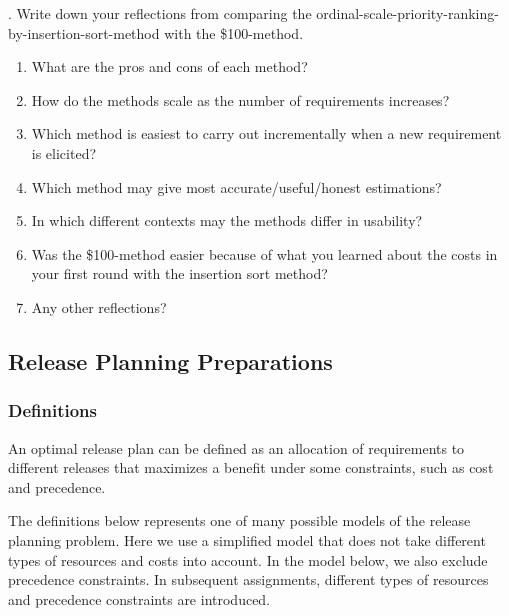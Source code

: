 \documentclass[11pt]{article}
\begin{document}
 
\begin{framed}
. Write down your reflections from comparing the ordinal-scale-priority-ranking-by-insertion-sort-method with the \$100-method. 

\begin{enumerate}[noitemsep]
\item What are the pros and cons of each method? 
\item How do the methods scale as the number of requirements increases? 
\item Which method is easiest to carry out incrementally when a new requirement is elicited?
\item Which method may give most accurate/useful/honest estimations? 
\item In which different contexts may the methods differ in usability? 
\item Was the \$100-method easier because of what you learned about the costs in your first round with the insertion sort method? 
\item Any other reflections?
\vspace{12cm}
\end{enumerate}

\end{framed}

\clearpage\newpage 
\subsection{Release Planning Preparations}

\subsubsection{Definitions}\label{section:rpdef}

An optimal release plan can be defined as an allocation of requirements to different releases that maximizes a benefit under some constraints, such as cost and precedence. 

The definitions below represents one of many possible models of the release planning problem. Here we use a simplified model that does not take different types of resources and costs into account. In the model below, we also exclude precedence constraints. In subsequent assignments, different types of resources and precedence constraints are introduced.
\end{document}
